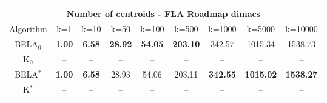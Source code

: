 \begin{tabular}{c|cccccccc}\toprule
\multicolumn{9}{c}{Number of centroids - FLA Roadmap dimacs}\\ \midrule
Algorithm & k=1 & k=10 & k=50 & k=100 & k=500 & k=1000 & k=5000 & k=10000 \\ \midrule
BELA$_0$ & \textbf{1.00} & \textbf{6.58} & \textbf{28.92} & \textbf{54.05} & \textbf{203.10} & 342.57 & 1015.34 & 1538.73 \\
K$_0$ & -- & -- & -- & -- & -- & -- & -- & -- \\
BELA$^*$ & \textbf{1.00} & \textbf{6.58} & 28.93 & 54.06 & 203.11 & \textbf{342.55} & \textbf{1015.02} & \textbf{1538.27} \\
K$^*$ & -- & -- & -- & -- & -- & -- & -- & -- \\ \bottomrule 
\end{tabular}
